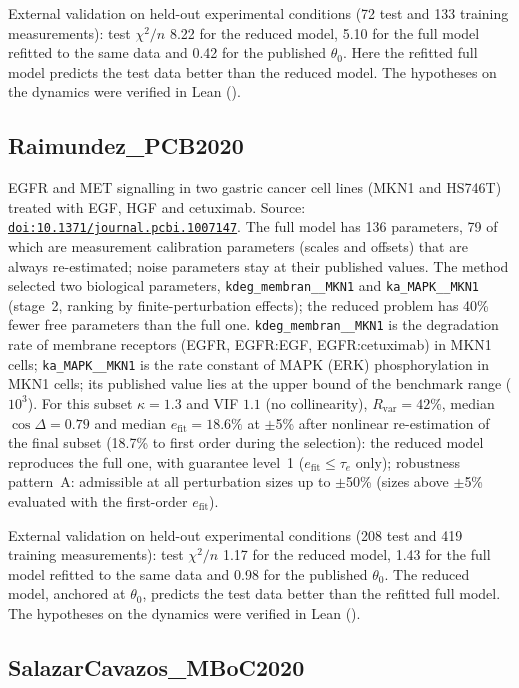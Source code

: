 External validation on held-out experimental conditions (72 test and 133 training measurements): test $\chi^2/n$ 8.22 for the reduced model, 5.10 for the full model refitted to the same data and 0.42 for the published $\theta_0$. Here the refitted full model predicts the test data better than the reduced model. The hypotheses on the dynamics were verified in Lean ().

\subsection*{Raimundez\_PCB2020}

EGFR and MET signalling in two gastric cancer cell lines (MKN1 and HS746T) treated with EGF, HGF and cetuximab. Source: \href{https://doi.org/10.1371/journal.pcbi.1007147}{\nolinkurl{doi:10.1371/journal.pcbi.1007147}}. The full model has 136 parameters, 79 of which are measurement calibration parameters (scales and offsets) that are always re-estimated; noise parameters stay at their published values. The method selected two biological parameters, \texttt{kdeg\_membran\_\_MKN1} and \texttt{ka\_MAPK\_\_MKN1} (stage~2, ranking by finite-perturbation effects); the reduced problem has 40\% fewer free parameters than the full one. \texttt{kdeg\_membran\_\_MKN1} is the degradation rate of membrane receptors (EGFR, EGFR:EGF, EGFR:cetuximab) in MKN1 cells; \texttt{ka\_MAPK\_\_MKN1} is the rate constant of MAPK (ERK) phosphorylation in MKN1 cells; its published value lies at the upper bound of the benchmark range ($10^3$). For this subset $\kappa=1.3$ and VIF $1.1$ (no collinearity), $R_{\mathrm{var}}=42\%$, median $\cos\Delta=0.79$ and median $e_{\mathrm{fit}}=18.6\%$ at $\pm$5\% after nonlinear re-estimation of the final subset (18.7\% to first order during the selection): the reduced model reproduces the full one, with guarantee level~1 ($e_{\mathrm{fit}}\le\tau_e$ only); robustness pattern~A: admissible at all perturbation sizes up to $\pm$50\% (sizes above $\pm$5\% evaluated with the first-order $e_{\mathrm{fit}}$).

External validation on held-out experimental conditions (208 test and 419 training measurements): test $\chi^2/n$ 1.17 for the reduced model, 1.43 for the full model refitted to the same data and 0.98 for the published $\theta_0$. The reduced model, anchored at $\theta_0$, predicts the test data better than the refitted full model. The hypotheses on the dynamics were verified in Lean ().

\subsection*{SalazarCavazos\_MBoC2020}

